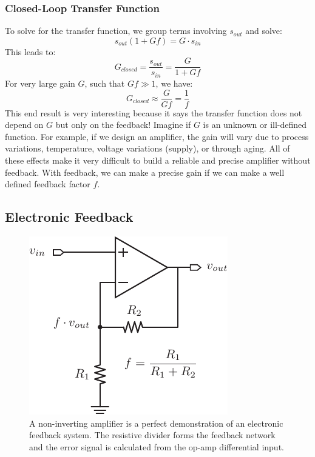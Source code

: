 \subsubsection{Closed-Loop Transfer Function}

To solve for the transfer function, we group terms involving $s_{out}$ and solve:
%
\begin{equation}
	{s_{out}}(1 + Gf) = G \cdot {s_{in}}
\end{equation}
% 
This leads to:
\begin{equation}
	{G_{closed}} = \frac{{{s_{out}}}}{{{s_{in}}}} = \frac{G}{{1 + Gf}}
\end{equation}
%
For very large gain $G$, such that $Gf \gg 1$, we have:
%
\begin{equation}
	{G_{closed}} \approx \frac{G}{{Gf}} = \frac{1}{f}
	\label{eq:largegain}
\end{equation}
%
This end result is very interesting because it says the transfer function does not depend on $G$ but only on the feedback!  Imagine if $G$ is an unknown or ill-defined function.  For example, if we design an amplifier, the gain will vary due to process variations, temperature, voltage variations (supply), or through aging.  All of these effects make it very difficult to build a reliable and precise amplifier without feedback.  With feedback, we can make a precise gain if we can make a well defined feedback factor $f$.



\subsection{Electronic Feedback}



\begin{figure}[tb]
\begin{center}
\includegraphics[scale=1]{opamp_fb}
\end{center}
\caption{A non-inverting amplifier is a perfect demonstration of an electronic feedback system.  The resistive divider forms the feedback network and the error signal is calculated from the op-amp differential input.} \label{fig:opamp_fb}
\end{figure}

